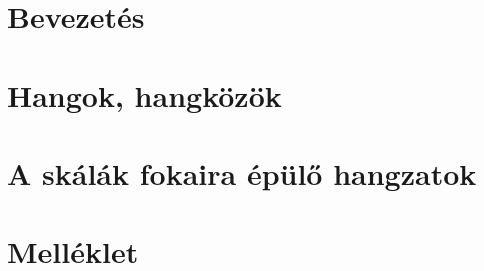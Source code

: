 
 
 





\tableofcontents
\clearpage

\section*{Bevezetés}
\label{sec:bevezetes}


\section{Hangok, hangközök}
\label{sec:hangokhangkozok}


%
%
%

\section{A skálák fokaira épülő hangzatok}
\label{sec:skalahangzat}


%
%
%
%
%
%
%
%
%
\section{Melléklet}
\label{sec:melleklet}

%


